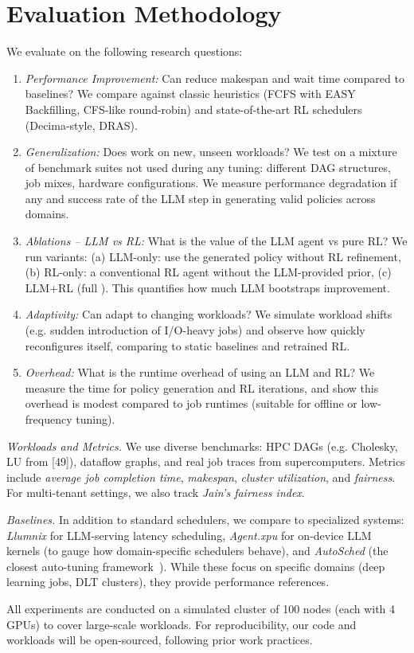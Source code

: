 \section{Evaluation Methodology}

We evaluate \sys{} on the following research questions:

\begin{enumerate}
\item \emph{Performance Improvement:} Can \sys{} reduce makespan and wait time compared to baselines? We compare against classic heuristics (FCFS with EASY Backfilling, CFS-like round-robin) and state-of-the-art RL schedulers (Decima-style, DRAS).
\item \emph{Generalization:} Does \sys{} work on new, unseen workloads? We test on a mixture of benchmark suites not used during any tuning: different DAG structures, job mixes, hardware configurations. We measure performance degradation if any and success rate of the LLM step in generating valid policies across domains.
\item \emph{Ablations -- LLM vs RL:} What is the value of the LLM agent vs pure RL? We run variants: (a) LLM-only: use the generated policy without RL refinement, (b) RL-only: a conventional RL agent without the LLM-provided prior, (c) LLM+RL (full \sys{}). This quantifies how much LLM bootstraps improvement.
\item \emph{Adaptivity:} Can \sys{} adapt to changing workloads? We simulate workload shifts (e.g. sudden introduction of I/O-heavy jobs) and observe how quickly \sys{} reconfigures itself, comparing to static baselines and retrained RL.
\item \emph{Overhead:} What is the runtime overhead of using an LLM and RL? We measure the time for policy generation and RL iterations, and show this overhead is modest compared to job runtimes (suitable for offline or low-frequency tuning).
\end{enumerate}

\emph{Workloads and Metrics.} We use diverse benchmarks: HPC DAGs (e.g. Cholesky, LU from [49]), dataflow graphs, and real job traces from supercomputers. Metrics include \emph{average job completion time}, \emph{makespan}, \emph{cluster utilization}, and \emph{fairness}. For multi-tenant settings, we also track \emph{Jain's fairness index}.

\emph{Baselines.} In addition to standard schedulers, we compare to specialized systems: \emph{Llumnix} for LLM-serving latency scheduling, \emph{Agent.xpu} for on-device LLM kernels (to gauge how domain-specific schedulers behave), and \emph{AutoSched} (the closest auto-tuning framework~\cite{tianweiz07,tianweiz07b}). While these focus on specific domains (deep learning jobs, DLT clusters), they provide performance references.

All experiments are conducted on a simulated cluster of 100 nodes (each with 4 GPUs) to cover large-scale workloads. For reproducibility, our code and workloads will be open-sourced, following prior work practices.